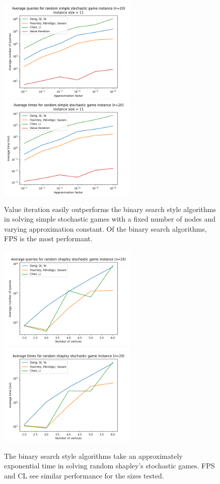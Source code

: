   \vspace{-20pt}
  \begin{figure}[H]
      \centering
      \includegraphics[width=2.6in]{plots/simple_eps_queries.png}
      \centering
      \includegraphics[width=2.6in]{plots/simple_eps_times.png}
      \caption{ Value iteration easily outperforms the binary search style algorithms
      in solving simple stochastic games with a fixed number of nodes and varying approximation constant.
      Of the binary search algorithms, FPS is the most performant.} \label{simpleApproxPlot}
  \end{figure}
  \vspace{-20pt}
  \begin{figure}[H]
      \centering
      \includegraphics[width=2.6in]{plots/shapley_queries.png}
      \centering
      \includegraphics[width=2.6in]{plots/shapley_times.png}
      \caption{ The binary search style algorithms take an approximately exponential
      time in solving random shapley's stochastic games. FPS and CL see similar performance for the
      sizes tested.} \label{shapleyMainPlot}
  \end{figure}
